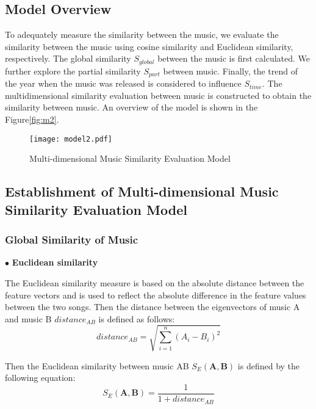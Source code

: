 \documentclass[12pt]{article}  %
\newenvironment{shrinkeq}[1]
{ \bgroup
	\addtolength\abovedisplayshortskip{#1}
	\addtolength\abovedisplayskip{#1}
	\addtolength\belowdisplayshortskip{#1}
	\addtolength\belowdisplayskip{#1}}
{\egroup\ignorespacesafterend}
\begin{document}
\subsection{Model Overview}
\vspace{-0.4cm}
To adequately measure the similarity between the music, we evaluate the similarity between the music using cosine similarity and Euclidean similarity, respectively. The global similarity $S_{global}$ between the music is first calculated. We further explore the partial similarity $S_{part}$ between music. Finally, the trend of the year when the music was released is considered to influence $S_{time}$. The multidimensional similarity evaluation between music is constructed to obtain the similarity between music. An overview of the model is shown in the Figure\eqref{fig:m2}.

\begin{figure}[htbp]
	\centering
	\texttt{[image: model2.pdf]}
	\caption{Multi-dimensional Music Similarity Evaluation Model}\label{fig:m2}
\end{figure}

\subsection{Establishment of Multi-dimensional Music Similarity Evaluation Model}
\subsubsection{Global Similarity of Music}
$\bullet$ \textbf{Euclidean similarity}

The Euclidean similarity measure is based on the absolute distance between the feature vectors and is used to reflect the absolute difference in the feature values between the two songs. Then the distance between the eigenvectors of music A and music B $distance_{AB}$ is defined as follows:
\begin{shrinkeq}{-1.5ex}
	\begin{equation}
	distance_{AB}=\sqrt{\sum\limits_{i=1}^{n}(A_i-B_i)^2}
	\end{equation}
\end{shrinkeq}

Then the Euclidean similarity between music AB $S_E(\mathbf{A},\mathbf{B})$ is defined by the following equation:
\begin{shrinkeq}{-1.5ex}
	\begin{equation}
	S_E(\mathbf{A},\mathbf{B})=\frac{1}{1+distance_{AB}}
	\end{equation}
\end{shrinkeq}
\end{document}
